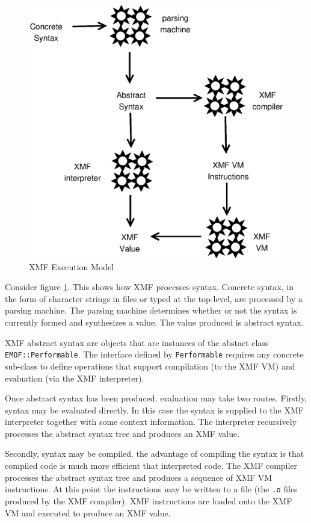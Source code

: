 \documentclass{article}
\begin{document}
\begin{figure}
\begin{center}
\includegraphics[scale=0.4]{Execution.eps}
\end{center}
\caption{XMF Execution Model}
\label{Execution}
\end{figure}

Consider figure \ref{Execution}. This shows how XMF processes syntax.
Concrete syntax, in the form of character strings in files or typed at
the top-level, are processed by a parsing machine. The parsing machine
determines whether or not the syntax is currently formed and synthesizes
a value. The value produced is abstract syntax.

XMF abstract syntax are objects that are instances of the abstact class
{\tt EMOF::Performable}. The interface defined by {\tt Performable}
requires any concrete sub-class to define operations that support
compilation (to the XMF VM) and evaluation (via the XMF interpreter).

Once abstract syntax has been produced, evaluation may take two routes.
Firstly, syntax may be evaluated directly. In this case the syntax
is supplied to the XMF interpreter together with some context information.
The interpreter recursively processes the abstract syntax tree and produces
an XMF value.

Secondly, syntax may be compiled. the advantage of compiling the syntax is
that compiled code is much more efficient that interpreted code. The
XMF compiler processes the abstract syntax tree and produces a sequence of
XMF VM instructions. At this point the instructions may be written to
a file (the {\tt .o} files produced by the XMF compiler). XMF instructions
are loaded onto the XMF VM and executed to produce an XMF value.
\end{document}
